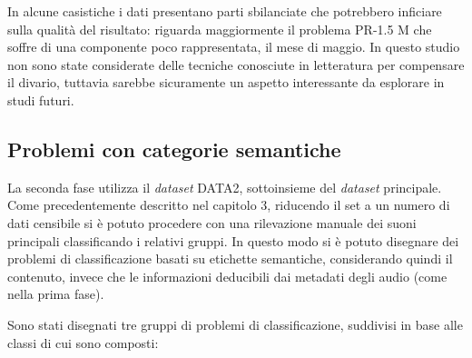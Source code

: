 In alcune casistiche i dati presentano parti sbilanciate che potrebbero inficiare sulla qualità
del risultato: riguarda maggiormente il problema PR-1.5 M che soffre di una componente poco
rappresentata, il mese di maggio. In questo studio non sono state considerate delle tecniche
conosciute in letteratura per compensare il divario, tuttavia sarebbe sicuramente un aspetto
interessante da esplorare in studi futuri.

\subsection{Problemi con categorie semantiche}
La seconda fase utilizza il \textit{dataset} DATA2, sottoinsieme del \textit{dataset} principale. Come
precedentemente descritto nel capitolo 3, riducendo il set a un numero di dati censibile si è potuto
procedere con una rilevazione manuale dei suoni principali classificando i relativi gruppi. In
questo modo si è potuto disegnare dei problemi di classificazione basati su etichette
semantiche, considerando quindi il contenuto, invece che le informazioni deducibili dai
metadati degli audio (come nella prima fase). 

Sono stati disegnati tre gruppi di problemi di classificazione, suddivisi in base alle classi di
cui sono composti:


